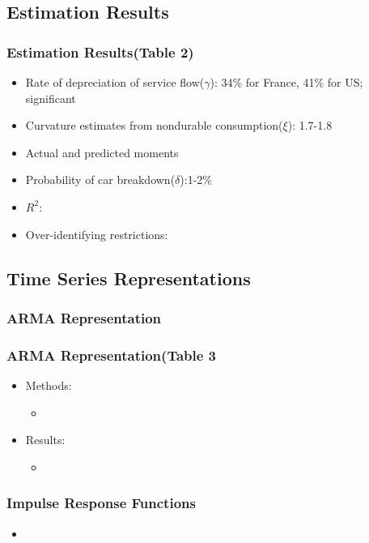 \documentclass{beamer}
\begin{document}
\subsection{Estimation Results}

\begin{frame}
\frametitle{Estimation Results(Table 2)}
\begin{itemize}
\item Rate of depreciation of service flow($\gamma$): 34\% for France, 41\% for US; significant
\item Curvature estimates from nondurable consumption($\xi$): 1.7-1.8
\item Actual and predicted moments 
\item Probability of car breakdown($\delta$):1-2\%
\item $R^2$: %
\item Over-identifying restrictions: %
\end{itemize}
\end{frame}

\subsection{Time Series Representations}
\subsubsection{ARMA Representation}
\begin{frame}
\frametitle{ARMA Representation(Table 3}
\begin{itemize}
\item Methods:
\begin{itemize}
\item 
\end{itemize}
\item Results:
\begin{itemize}
\item
\end{itemize}
\end{itemize}
\end{frame}

\subsubsection{Impulse Response Functions}
\begin{frame}
\begin{itemize}
\item 
\end{itemize}
\end{frame}
\end{document}
